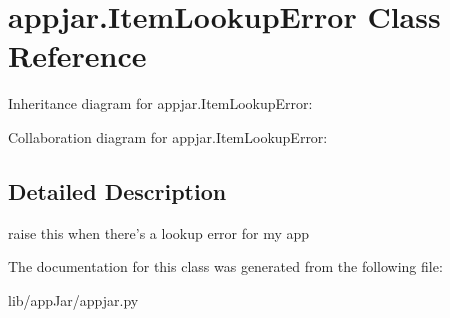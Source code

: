 \hypertarget{classappjar_1_1_item_lookup_error}{}\section{appjar.\+Item\+Lookup\+Error Class Reference}
\label{classappjar_1_1_item_lookup_error}


Inheritance diagram for appjar.\+Item\+Lookup\+Error\+:


Collaboration diagram for appjar.\+Item\+Lookup\+Error\+:


\subsection{Detailed Description}
\begin{DoxyVerb}raise this when there's a lookup error for my app\end{DoxyVerb}
 

The documentation for this class was generated from the following file\+:\begin{DoxyCompactItemize}
\item 
lib/app\+Jar/appjar.\+py\end{DoxyCompactItemize}
